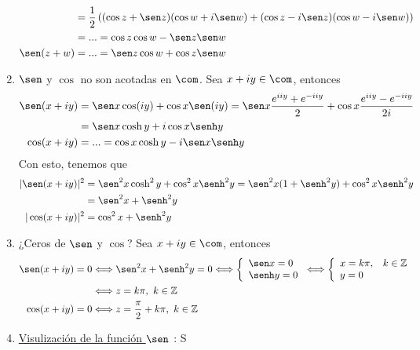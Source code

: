 \begin{enumerate}
\begin{align*}
        &= \frac{1}{2}\left( (\cos z + \sen z)(\cos w + i\sen w) + (\cos z -i\sen z)(\cos w - i\sen w)\right) \\
        & = ... = \cos z \cos w - \sen z \sen w \\
        \sen(z+w) &= ... = \sen z \cos w + \cos z \sen w
    \end{align*}
    \item $\sen$ y $\cos$ no son acotadas en $\com$. Sea $x + iy \in \com$, entonces
    \begin{align*}
        \sen(x+iy) &= \sen x \cos(iy) + \cos x \sen(iy) = \sen x \frac{e^{iiy} + e^{-iiy}}{2} + \cos x\frac{e^{iiy}-e^{-iiy}}{2i} \\
        &= \sen x \cosh y + i \cos x \senh y \\
        \cos(x + iy) &= ... = \cos x \cosh y - i\sen x \senh y
    \end{align*}
    Con esto, tenemos que
    \begin{align*}
        |\sen(x+iy)|^2 &= \sen^2 x \cosh^2 y + \cos^2 x \senh^2 y = \sen^2 x (1 + \senh^2 y) + \cos^2 x \senh^2 y \\
        &= \sen^2 x + \senh^2 y \\
        |\cos(x+iy)|^2 &= \cos^2 x + \senh^2 y
    \end{align*}
    \item ¿Ceros de $\sen$ y $\cos$? Sea $x +iy \in \com$, entonces
    \begin{align*}
        \sen(x+iy) = 0 & \Longleftrightarrow \sen^2 x + \senh^2 y = 0 \Longleftrightarrow \left\{ \begin{array}{lcc}
            \sen x = 0 \\
           \senh y = 0\\
             \end{array}
        \right. \Longleftrightarrow \left\{ \begin{array}{lcc}
            x = k\pi, & k \in \mathbb{Z} \\
           y = 0\\
             \end{array}
        \right. \\
        & \Longleftrightarrow z = k\pi, \ k \in \mathbb{Z} \\
        \cos(x + iy) = 0 &\Longleftrightarrow  z = \frac{\pi}{2} + k\pi, \ k \in \mathbb{Z}
    \end{align*}
    \item \underline{Visulización de la función $\sen$} : S
    \begin{itemize}

\end{itemize}
\end{enumerate}
